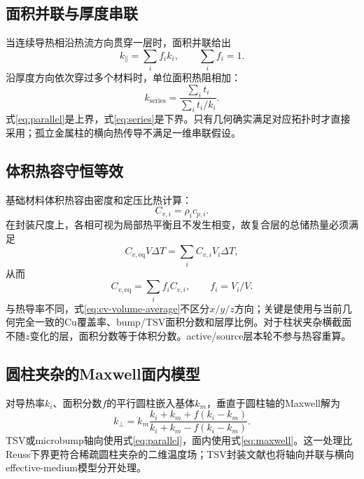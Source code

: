 \documentclass[UTF8,zihao=-4]{ctexart}
\begin{document}
\subsection{面积并联与厚度串联}

当连续导热相沿热流方向贯穿一层时，面积并联给出
\begin{equation}
  k_{\parallel}=\sum_i f_i k_i, \qquad \sum_i f_i=1.
  \label{eq:parallel}
\end{equation}
沿厚度方向依次穿过多个材料时，单位面积热阻相加：
\begin{equation}
  k_{\mathrm{series}}=\frac{\sum_i t_i}{\sum_i t_i/k_i}.
  \label{eq:series}
\end{equation}
式\eqref{eq:parallel}是上界，式\eqref{eq:series}是下界。只有几何确实满足对应拓扑时才直接采用；孤立金属柱的横向热传导不满足一维串联假设。

\subsection{体积热容守恒等效}

基础材料体积热容由密度和定压比热计算：
\begin{equation}
  C_{v,i}=\rho_i c_{p,i}.
  \label{eq:cv-rho-cp}
\end{equation}
在封装尺度上，各相可视为局部热平衡且不发生相变，故复合层的总储热量必须满足
\begin{equation}
  C_{v,\mathrm{eq}}V\Delta T
  =\sum_i C_{v,i}V_i\Delta T,
\end{equation}
从而
\begin{equation}
  C_{v,\mathrm{eq}}=\sum_i f_i C_{v,i},
  \qquad f_i=V_i/V.
  \label{eq:cv-volume-average}
\end{equation}
与热导率不同，式\eqref{eq:cv-volume-average}不区分$x/y/z$方向；关键是使用与当前几何完全一致的Cu覆盖率、bump/TSV面积分数和层厚比例。对于柱状夹杂横截面不随$z$变化的层，面积分数等于体积分数。active/source层本轮不参与热容重算。

\subsection{圆柱夹杂的Maxwell面内模型}

对导热率$k_i$、面积分数$f$的平行圆柱嵌入基体$k_m$，垂直于圆柱轴的Maxwell解为
\begin{equation}
  k_{\perp}=k_m
  \frac{k_i+k_m+f(k_i-k_m)}{k_i+k_m-f(k_i-k_m)}.
  \label{eq:maxwell}
\end{equation}
TSV或microbump轴向使用式\eqref{eq:parallel}，面内使用式\eqref{eq:maxwell}。这一处理比Reuss下界更符合稀疏圆柱夹杂的二维温度场；TSV封装文献也将轴向并联与横向effective-medium模型分开处理\cite{MaYuWang2014}。
\end{document}
